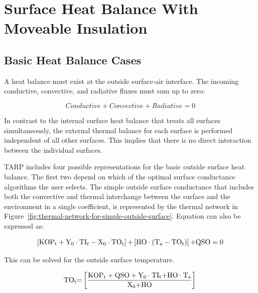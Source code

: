 \section{Surface Heat Balance With Moveable Insulation}\label{surface-heat-balance-with-moveable-insulation}

\subsection{Basic Heat Balance Cases}\label{basic-heat-balance-cases}

A heat balance must exist at the outside surface-air interface. The incoming conductive, convective, and radiative fluxes must sum up to zero:

\begin{equation}
Conductive + Convective + Radiative = 0
\end{equation}

In contrast to the internal surface heat balance that treats all surfaces simultaneously, the external thermal balance for each surface is performed independent of all other surfaces. This implies that there is no direct interaction between the individual surfaces.

TARP includes four possible representations for the basic outside surface heat balance. The first two depend on which of the optimal surface conductance algorithms the user selects. The simple outside surface conductance that includes both the convective and thermal interchange between the surface and the environment in a single coefficient, is represented by the thermal network in Figure~\ref{fig:thermal-network-for-simple-outside-surface}. Equation can also be expressed as:

\begin{equation}
\left[ {{\rm{KO}}{{\rm{P}}_{\rm{t}}} + {{\rm{Y}}_{\rm{0}}}\cdot {\rm{T}}{{\rm{I}}_t} - {{\rm{X}}_{\rm{0}}}\cdot {\rm{T}}{{\rm{O}}_{\rm{t}}}} \right]{\rm{ + }}\left[ {{\rm{HO}}\cdot \left( {{{\rm{T}}_{\rm{a}}} - {\rm{T}}{{\rm{O}}_t}} \right)} \right]{\rm{  + QSO  =  0}}
\end{equation}

This can be solved for the outside surface temperature.

\begin{equation}
{\rm{T}}{{\rm{O}}_{\rm{t}}}{\rm{ = }}\left[ {\frac{{{\rm{KO}}{{\rm{P}}_{\rm{t}}} + {\rm{QSO}} + {{\rm{Y}}_0}\cdot {\rm{T}}{{\rm{I}}_{\rm{t}}}{\rm{ + HO}}\cdot {{\rm{T}}_{\rm{a}}}}}{{{{\rm{X}}_{\rm{0}}}{\rm{ + HO}}}}} \right]{\rm{  }}
\end{equation}

